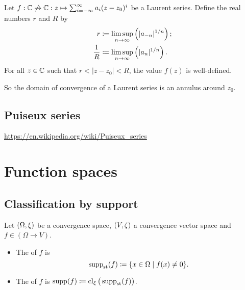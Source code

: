 \begin{proposition} \label{LaurentSeriesConvergence}
Let $f: \mathbb{C}\not\to \mathbb{C}: z\mapsto \sum_{i=-\infty}^\infty a_i(z-z_0)^i$ be a Laurent series. Define the real numbers $r$ and $R$ by
\begin{align*}
r &\coloneqq \limsup_{n\to\infty}\left(|a_{-n}|^{1/n}\right); \\
\frac{1}{R} &\coloneqq \limsup_{n\to\infty}\left(|a_n|^{1/n}\right).
\end{align*}
For all $z\in \mathbb{C}$ such that $r < |z-z_0| < R$, the value $f(z)$ is well-defined.
\end{proposition}
So the domain of convergence of a Laurent series is an annulus around $z_0$.

\section{Puiseux series}
\url{https://en.wikipedia.org/wiki/Puiseux_series}


\chapter{Function spaces}
\section{Classification by support}
\begin{definition}
Let $\sSet{\Omega, \xi}$ be a convergence space, $\sSet{V,\zeta}$ a convergence vector space and $f\in (\Omega\to V)$.
\begin{itemize}
\item The  of $f$ is
\[ \supp_\text{st}(f) \defeq \setbuilder{x\in \Omega}{f(x) \neq 0}. \]
\item The  of $f$ is $\operatorname{supp}(f) \coloneqq \operatorname{cl}_\xi\big(\operatorname{supp}_\text{st}(f)\big)$.
\end{itemize}
\end{definition}

